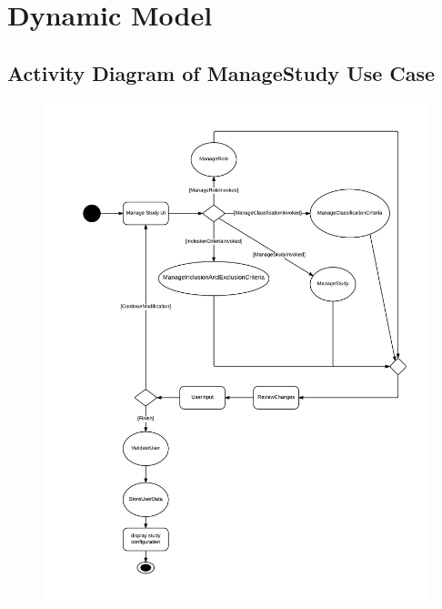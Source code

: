 \section{Dynamic Model}
\subsection{Activity Diagram of ManageStudy Use Case}
\begin{figure}[H]
  \includegraphics[width=45em]{section/DynamicModel/Activity_Diagram_Manage_Study}
  \label{fig: Activity Diagram of ManageStudy Use Case}
\end{figure}

